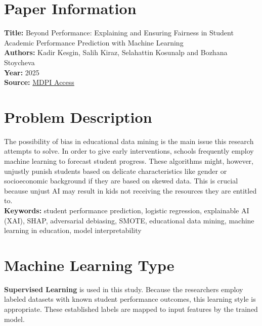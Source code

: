 \documentclass[12pt]{article}
\begin{document}
\tableofcontents						%
\thispagestyle{empty}
\clearpage
{}
\pagestyle{fancy}
\fancyhf{} 	
\rfoot{\thepage}						%



\section{Paper Information}
\textbf{Title:} Beyond Performance: Explaining and Ensuring Fairness in Student Academic Performance Prediction with Machine Learning \\
\textbf{Authors:} Kadir Kesgin, Salih Kiraz, Selahattin Kosunalp and Bozhana Stoycheva\\
\textbf{Year:} 2025 \\
\textbf{Source:} \href{https://www.mdpi.com/3425204}{MDPI Access}

\section{Problem Description}
The possibility of bias in educational data mining is the main issue this research attempts to solve. In order to give early interventions, schools frequently employ machine learning to forecast student progress. These algorithms might, however, unjustly punish students based on delicate characteristics like gender or socioeconomic background if they are based on skewed data. This is crucial because unjust AI may result in kids not receiving the resources they are entitled to. \\
\textbf{Keywords:} student performance prediction, logistic regression, explainable AI (XAI), SHAP, adversarial debiasing, SMOTE, educational data mining, machine learning in education, model interpretability

\section{Machine Learning Type}
\textbf{Supervised Learning} is used in this study. Because the researchers employ labeled datasets with known student performance outcomes, this learning style is appropriate. These established labels are mapped to input features by the trained model.
\end{document}
